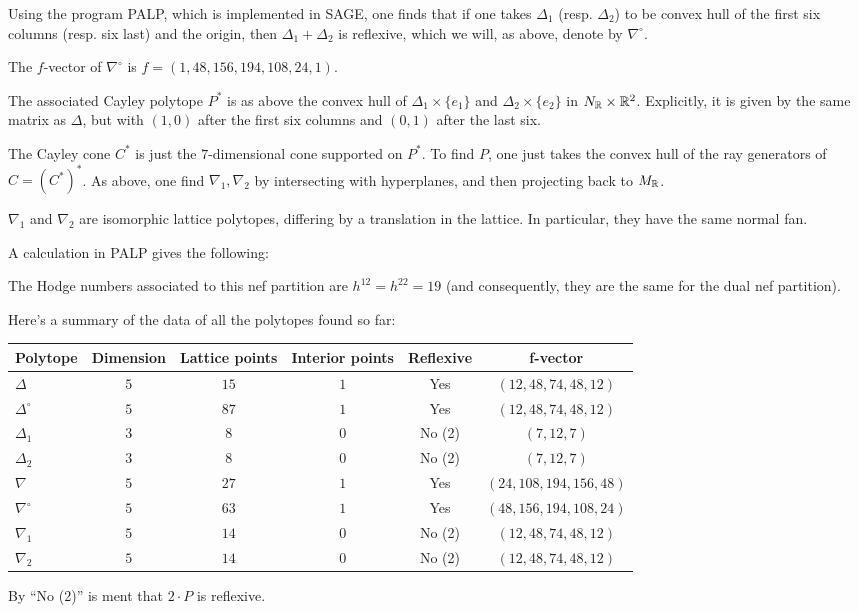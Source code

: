 \documentclass[11pt, english]{article}
\begin{document}
Using the program PALP, which is implemented in SAGE, one finds that if one takes $\Delta_1$ (resp. $\Delta_2$) to be convex hull of the first six columns (resp. six last) and the origin, then $\Delta_1+\Delta_2$ is reflexive, which we will, as above, denote by $\nabla^\circ$.

\begin{lemma}
  The $f$-vector of $\nabla^\circ$ is $f=(1, 48, 156, 194, 108, 24, 1)$. 
\end{lemma}

The associated Cayley polytope $P^\ast$ is as above the convex hull of $\Delta_1 \times \{ e_1\}$ and $\Delta_2 \times \{ e_2\} $ in $N_{\mathbb{R}} \times \mathbb{R}^2$. Explicitly, it is given by the same matrix as $\Delta$, but with $(1,0)$ after the first six columns and $(0,1)$ after the last six.

The Cayley cone $C^\ast$ is just the $7$-dimensional cone supported on $P^\ast$. To find $P$, one just takes the convex hull of the ray generators of $C=(C^\ast)^\ast$. As above, one find $\nabla_1,\nabla_2$ by intersecting with hyperplanes, and then projecting back to $M_{\mathbb{R}}$. 

\begin{lemma}
$\nabla_1$ and $\nabla_2$ are isomorphic lattice polytopes, differing by a translation in the lattice. In particular, they have the same normal fan.   
\end{lemma}

A calculation in PALP gives the following:
\begin{lemma}
The Hodge numbers associated to this nef partition are $h^{12}=h^{22}=19$ (and consequently, they are the same for the dual nef partition).
\end{lemma}

Here's a summary of the data of all the polytopes found so far:


\begin{center}
  \begin{tabular}{l| c c c c c}
Polytope & Dimension & Lattice points & Interior points & Reflexive & f-vector \\
\hline 
$\Delta$ & $5$ & $15$ & $1$ & Yes & $(12, 48, 74, 48, 12)$ \\
$\Delta^\circ$ & $5$ & $87$ & $1$ & Yes & $(12, 48, 74, 48, 12)$ \\
$\Delta_1$ & $3$ & $8$ & $0$ & No (2) & $(7, 12, 7)$ \\
$\Delta_2$ & $3$ & $8$ & $0$ & No (2) & $(7, 12, 7)$ \\
$\nabla$ & $5$ & $27$ & $1$ & Yes & $(24, 108, 194, 156, 48)$ \\
$\nabla^\circ$ & $5$ & $63$ & $1$ & Yes & $(48, 156, 194, 108, 24)$ \\
$\nabla_1$ & $5$ & $14$ & $0$ & No (2)& $(12, 48, 74, 48, 12)$ \\
$\nabla_2$ & $5$ & $14$ & $0$ & No (2)& $(12, 48, 74, 48, 12)$ \\
\end{tabular}
\end{center}
By ``No (2)'' is ment that $2 \cdot P$ is reflexive. 
\end{document}
